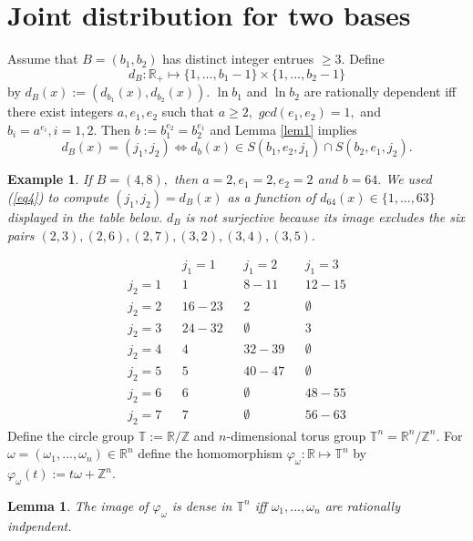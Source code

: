 \documentclass[14pt, twoside, a4paper]{article} %
\newtheorem{example}{Example}
\newtheorem{lem}{Lemma}                                                    %
\begin{document}
\section{Joint distribution for two bases}\label{sec1}
%
Assume that $B = (b_1,b_2)$ has distinct integer entrues $\ge 3.$ Define 
%
$$d_B : \mathbb R_+ \mapsto \{1,...,b_1-1\} \times \{1,...,b_2-1\}$$ 
%
by
$d_B(x) := (d_{b_1}(x), d_{b_2}(x)).$
$\ln b_1$ and $\ln b_2$ are rationally dependent iff there exist integers $a, e_1, e_2$ such that $a \geq 2,$ $gcd(e_1,e_2) = 1,$ and $b_i = a^{e_i}, i = 1, 2.$  Then
$b := b_1^{e_2} = b_2^{e_1}$ and
Lemma \ref{lem1} implies 
%
\begin{equation}\label{eq4}
 d_B(x) = (j_1,j_2) \iff d_b(x) \in
 S(b_1,e_2,j_1) \cap S(b_2,e_1,j_2).
\end{equation}
%
\begin{example}\label{ex1}
If $B = (4,8),$ then $a = 2, e_1 = 2, e_2 = 2$ and $b = 64.$ We used 
(\ref{eq4}) to compute $(j_1,j_2) = d_B(x)$ as a function of $d_{64}(x) \in \{1,...,63\}$
displayed in the table below. 
$d_B$ is not surjective because its image excludes the six pairs  
$(2,3), (2,6), (2,7), (3,2), (3,4), (3,5).$ 
\end{example}
$$
\begin{array}{cccccccc}
      		 &  & j_1 = 1    	 & &  j_1 =2    & & j_1 = 3      \\
  j_2 = 1     &  & 1              & &  8-11   & &    12-15  \\
  j_2 = 2     &  &  16-23      & &  2        & &   \emptyset       \\ 
  j_2 = 3     &  &  24-32      & &   \emptyset        & &  3         \\
  j_2=  4     & 	&	4	           &	&  32-39   & &  \emptyset       \\
  j_2=  5     & 	&	5		      &	&  40-47    & &   \emptyset        \\
  j_2=  6     &  &  6             & &  \emptyset       & &  48-55    \\
  j_2 =  7    &	&	7	           &	&   \emptyset         & & 56-63
\end{array}
$$
Define the circle group 
$\mathbb T := \mathbb R / \mathbb Z$ and $n$-dimensional torus group
$\mathbb T^n = \mathbb R^n / \mathbb Z^n.$
For $\omega = (\omega_1,...,\omega_n) \in \mathbb R^n$ define the homomorphism
$\varphi_{\omega} : \mathbb R \mapsto \mathbb T^n$ by 
$\varphi_\omega(t) := t\omega + \mathbb Z^n.$
%
\begin{lem}\label{lem2}
The image of $\varphi_\omega$ is dense in 
$\mathbb T^n$ iff $\omega_1,...,\omega_n$ are rationally indpendent.
\end{lem}
\end{document}
